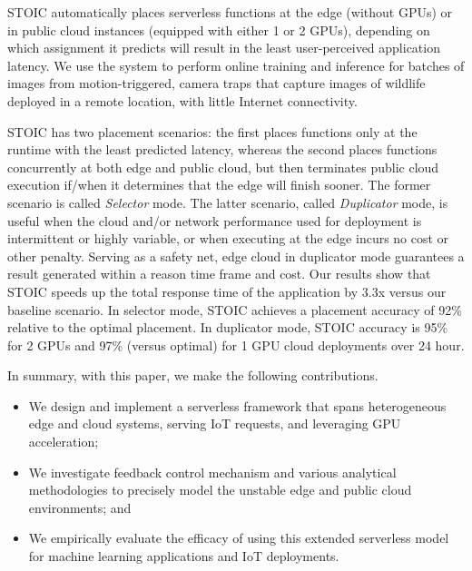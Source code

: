 STOIC automatically places serverless functions at the edge (without GPUs) or in public cloud instances (equipped with either 1 or 2 GPUs), depending on which assignment it predicts will result in the least user-perceived application latency. We use the system to perform online training and inference for batches of images from motion-triggered, camera traps that capture images of wildlife deployed in a remote location, with little Internet connectivity.


STOIC has two placement scenarios: the first places functions only at the runtime with the least predicted latency, whereas the second places functions concurrently at both edge and public cloud, but then terminates public cloud execution if/when it determines that the edge will finish sooner. The former scenario is called \textit{Selector} mode. The latter scenario, called \textit{Duplicator} mode, is useful when the cloud and/or network performance used for deployment is intermittent or highly variable, or when executing at the edge incurs no cost or other penalty. Serving as a safety net, edge cloud in duplicator mode guarantees a result generated within a reason time frame and cost. Our results show that STOIC speeds up the total response time of the application by 3.3x versus our baseline scenario. In selector mode, STOIC achieves a placement accuracy of 92\% relative to the optimal placement.  In duplicator mode, STOIC accuracy is 95\% for 2 GPUs and 97\% (versus optimal) for 1 GPU cloud deployments over 24 hour.

In summary, with this paper, we make the following contributions.
\begin{itemize}
\item We design and implement a serverless framework that spans heterogeneous edge and cloud systems, serving IoT requests, and leveraging GPU acceleration;
\item We investigate feedback control mechanism and various analytical methodologies to precisely model the unstable edge and public cloud environments; and 
\item We empirically evaluate the efficacy of using this extended serverless model for machine learning applications and IoT deployments.
\end{itemize}

